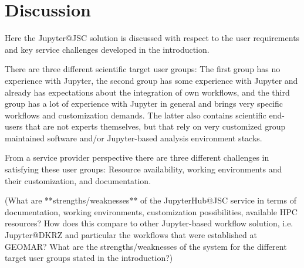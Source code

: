 \section{Discussion}

Here the Jupyter@JSC solution is discussed with respect to the user requirements and key service challenges developed in the introduction.

There are three different scientific target user groups: The first group has no experience with Jupyter, the second group has some experience with Jupyter and already has expectations about the integration of own workflows, and the third group has a lot of experience with Jupyter in general and brings very specific workflows and customization demands.
The latter also contains scientific end-users that are not experts themselves, but that rely on very customized group maintained software and/or Jupyter-based analysis environment stacks.

From a service provider perspective there are three different challenges in satisfying these user groups: Resource availability, working environments and their customization, and documentation.

(What are **strengths/weaknesses** of the JupyterHub@JSC service in terms of documentation, working environments, customization possibilities, available HPC resources? How does this compare to other Jupyter-based workflow solution, i.e. Jupyter@DKRZ and particular the workflows that were established at GEOMAR? What are the strengths/weaknesses of the system for the different target user groups stated in the introduction?)

